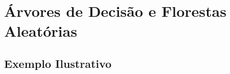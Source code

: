 
\chapter{Árvores de Decisão e Florestas Aleatórias}
\label{cap:arvores}

\section{Exemplo Ilustrativo}